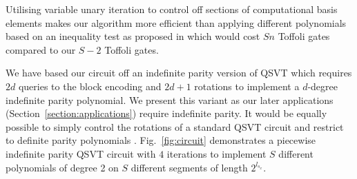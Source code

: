 \documentclass[a4paper,twocolumn,,accepted=2025-05-27]{quantumarticle}
\theoremstyle{empty}
\begin{document}
Utilising variable unary iteration to control off sections of computational basis elements makes our algorithm more efficient than applying different polynomials based on an inequality test as proposed in \cite{mcardleQuantumStatePreparation2022} which would cost $Sn$ Toffoli gates compared to our $S-2$ Toffoli gates.

We have based our circuit off an indefinite parity version of QSVT \cite{sunderhauf2023generalizedquantumsingularvalue} which requires $2d$ queries to the block encoding and $2d + 1$ rotations to implement a $d$-degree indefinite parity polynomial. We present this variant as our later applications (Section~\ref{section:applications}) require indefinite parity. It would be equally possible to simply control the rotations of a standard QSVT circuit and restrict to definite parity polynomials \footnotemark[1].
Fig.~\ref{fig:circuit} demonstrates a piecewise indefinite parity QSVT circuit with $4$ iterations to implement $S$ different polynomials of degree 2 on $S$ different segments of length $2^{l_{s_x}}$.
\end{document}
